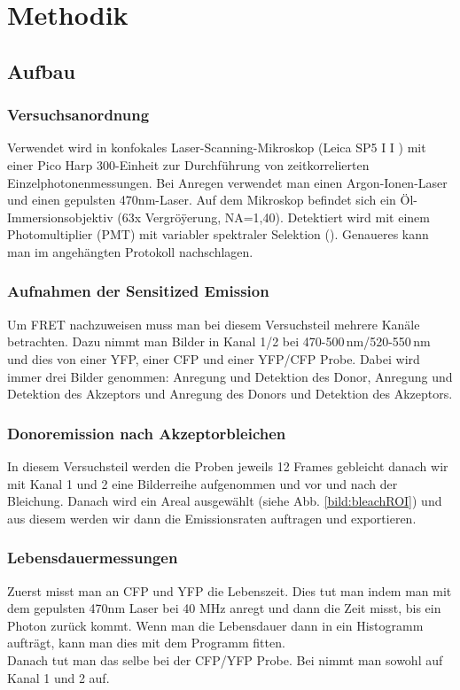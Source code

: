 
\chapter{Methodik}

\section{Aufbau}

\subsection{Versuchsanordnung}

Verwendet wird in konfokales Laser-Scanning-Mikroskop (Leica SP5 I I ) mit einer Pico Harp
300-Einheit zur Durchführung von zeitkorrelierten Einzelphotonenmessungen. Bei Anregen verwendet man einen Argon-Ionen-Laser 
und einen gepulsten 470nm-Laser. Auf dem Mikroskop befindet sich ein Öl-Immersionsobjektiv (63x Vergröÿerung, NA=1,40). Detektiert wird 
mit einem Photomultiplier (PMT) mit variabler spektraler Selektion (\cite{FRETSkript}). 
Genaueres kann man im angehängten Protokoll nachschlagen.

\subsection{Aufnahmen der Sensitized Emission}

Um FRET nachzuweisen muss man bei diesem Versuchsteil mehrere Kanäle betrachten. Dazu nimmt man Bilder in Kanal 1/2 
bei 470-500\,nm/520-550\,nm und dies von einer YFP, einer CFP und einer YFP/CFP Probe. Dabei wird immer drei Bilder 
genommen: Anregung und Detektion des Donor, Anregung und Detektion des Akzeptors und Anregung des Donors und Detektion des Akzeptors.


\subsection{Donoremission nach Akzeptorbleichen}

In diesem Versuchsteil werden die Proben jeweils 12 Frames gebleicht danach wir mit Kanal 1 und 2 eine Bilderreihe 
aufgenommen und vor und nach der Bleichung. Danach wird ein Areal ausgewählt (siehe Abb. \ref{bild:bleachROI}) und aus 
diesem werden wir dann die Emissionsraten auftragen und exportieren. 

\subsection{Lebensdauermessungen}

Zuerst misst man an CFP und YFP die Lebenszeit. Dies tut man indem man mit dem gepulsten 470nm Laser bei 40 MHz anregt und dann die Zeit misst, bis ein Photon zurück kommt. 
Wenn man die Lebensdauer dann in ein Histogramm aufträgt, kann man dies mit dem Programm fitten.\\
Danach tut man das selbe bei der CFP/YFP Probe. Bei nimmt man sowohl auf Kanal 1 und 2 auf.